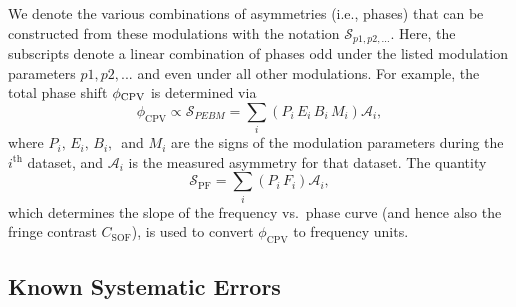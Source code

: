 We denote the various combinations of asymmetries (i.e., phases) that can be constructed from these modulations with the notation $\mathcal{S}_{p1,p2,...}$. Here, the subscripts denote a linear combination of phases odd under the listed modulation parameters $p1,p2,...$ and even under all other modulations. For example, the total phase shift $\phi_{\rm CPV}$ is determined via
\begin{equation}
    \phi_\mathrm{CPV} \propto \mathcal{S}_{PEBM} = \sum_i\left(P_i\,E_i\,B_i\,M_i\right)\mathcal{A}_i,
\end{equation}
where $P_i,\,E_i,\,B_i,\,$ and $M_i$ are the signs of the modulation parameters during the $i^\mathrm{th}$ dataset, and $\mathcal{A}_i$ is the measured asymmetry for that dataset.  
The quantity
\begin{equation}
    \mathcal{S}_\mathrm{PF} = \sum_i \left(P_i\,F_i\right)\mathcal{A}_i,
\end{equation}
which determines the slope of the frequency vs.~phase curve (and hence also the fringe contrast $C_\mathrm{SOF}$), is used to convert $\phi_\mathrm{CPV}$ to frequency units. 


\subsection{Known Systematic Errors}
\label{sec:frequency_shifts}

